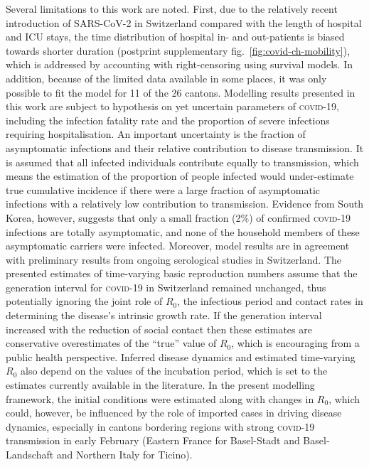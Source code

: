   Several limitations to this work are noted. First, due to the relatively recent introduction of SARS-CoV-2 in Switzerland compared with the length of hospital and ICU stays, the time distribution of hospital in- and out-patients is biased towards shorter duration (postprint supplementary fig.~\ref{fig:covid-ch-mobility}), which is addressed by accounting with right-censoring using survival models. In addition, because of the limited data available in some places, it was only possible to fit the model for 11 of the 26 cantons. Modelling results presented in this work are subject to hypothesis on yet uncertain parameters of \textsc{covid}-19, including the infection fatality rate and the proportion of severe infections requiring hospitalisation. An important uncertainty is the fraction of asymptomatic infections and their relative contribution to disease transmission. It is assumed that all infected individuals contribute equally to transmission, which means the estimation of the proportion of people infected would under-estimate true cumulative incidence if there were a large fraction of asymptomatic infections with a relatively low contribution to transmission. Evidence from South Korea, however, suggests that only a small fraction (2\%) of confirmed \textsc{covid}-19 infections are totally asymptomatic, and none of the household members of these asymptomatic carriers were infected\cite{Park:EarlyReleaseCoronavirus:2020}. Moreover, model results are in agreement with preliminary results from ongoing serological studies in Switzerland\cite{Stringhini:RepeatedSeroprevalenceAntiSARSCoV2:2020}.  The presented estimates of time-varying basic reproduction numbers assume that the generation interval for \textsc{covid}-19 in Switzerland remained unchanged, thus potentially ignoring the joint role of $R_0$, the infectious period and contact rates in determining the disease’s intrinsic growth rate\cite{Yan:SeparateRolesLatent:2008}. If the generation interval increased with the reduction of social contact then these estimates are conservative overestimates of the “true” value of $R_0$, which is encouraging from a public health perspective. Inferred disease dynamics and estimated time-varying $R_0$ also depend on the values of the incubation period, which is set to the estimates currently available in the literature. 
  In the present modelling framework, the initial conditions were estimated along with changes in $R_0$, which could, however, be influenced by the role of imported cases in driving disease dynamics, especially in cantons bordering regions with strong \textsc{covid}-19 transmission in early February (Eastern France for Basel-Stadt and Basel-Landschaft and Northern Italy for Ticino). 
